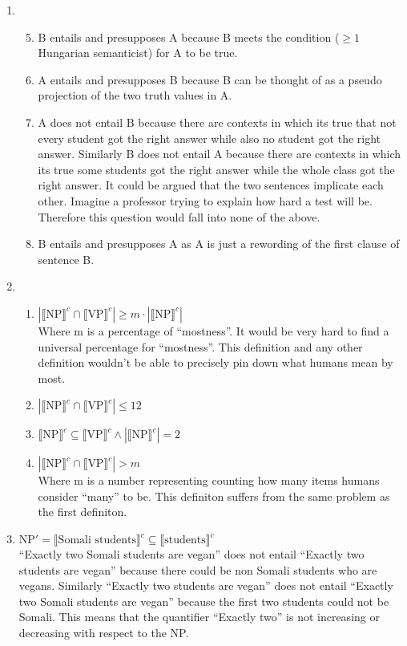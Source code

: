 \documentclass[20pt]{article}
\newcommand{\brackets}[1]{\ensuremath{\llbracket \text{#1}\rrbracket^{c}}}
\newcommand{\card}[1]{\ensuremath{| #1 |}}
\begin{document}
\begin{enumerate}[label=(\alph*)]
  \item
    \begin{enumerate}[label=(\arabic*)]
      \setcounter{enumii}{4}
      \item B entails and presupposes A because B meets the condition ($\ge1$
        Hungarian semanticist) for A to be true.
      \item A entails and presupposes B because B can be thought of as a pseudo
        projection of the two truth values in A.
      \item A does not entail B because there are contexts in which its true
        that not every student got the right answer while also no student got
        the right answer. Similarly B does not entail A because there are
        contexts in which its true some students got the right answer while the
        whole class got the right answer. It could be argued that the two
        sentences implicate each other. Imagine a professor trying to explain
        how hard a test will be. Therefore this question would fall into none of
        the above.
      \item B entails and presupposes A as A is just a rewording of the first
        clause of sentence B.
    \end{enumerate}
  \item
    \begin{enumerate}[label=(\alph*)]
      \item $\card{\brackets{NP} \cap \brackets{VP}} \ge m \cdot
        \card{\brackets{NP}}$ \\
        Where m is a percentage of ``mostness''. It would be very hard to find a
        universal percentage for ``mostness''. This definition and any other
        definition wouldn't be able to precisely pin down what humans mean by most.
      \item $\card{\brackets{NP} \cap \brackets{VP}} \le 12$
      \item $\brackets{NP} \subseteq \brackets{VP} \wedge \card{\brackets{NP}} = 2$
      \item $\card{\brackets{NP} \cap \brackets{VP}} > m$ \\
        Where m is a number representing counting how many items humans consider
        ``many'' to be. This definiton suffers from the same problem as the
        first definiton.
    \end{enumerate}
  \item
    $\text{NP}' = \brackets{Somali students} \subseteq \brackets{students}$ \\
    ``Exactly two Somali students are vegan'' does not entail ``Exactly two
    students are vegan'' because there could be non Somali students who are
    vegans. Similarly ``Exactly two students are vegan'' does not entail
    ``Exactly two Somali students are vegan'' because the first two students
    could not be Somali. This means that the quantifier ``Exactly two'' is not
    increasing or decreasing with respect to the NP.


\end{enumerate}
\end{document}
